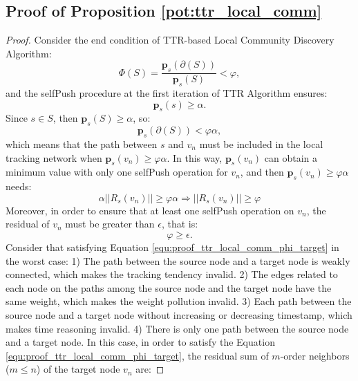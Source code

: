 \subsection{Proof of Proposition \ref{pot:ttr_local_comm}}
\begin{proof}
Consider the end condition of TTR-based Local Community Discovery Algorithm:
\begin{equation}
    \Phi(S)=\frac{\bm{p}_s(\partial(S))}{\bm{p}_s(S)} < \varphi,
\end{equation}
and the selfPush procedure at the first iteration of TTR Algorithm ensures:
\begin{equation}
    \bm{p}_s(s) \geq \alpha.
\end{equation}
Since $s \in S$, then $\bm{p}_s(S) \geq \alpha$, so:
\begin{equation}
    \bm{p}_s(\partial(S))<\varphi \alpha,
\end{equation}
which means that the path between $s$ and $v_n$ must be included in the local tracking network when $\bm{p}_s(v_n) \geq \varphi \alpha$. 
In this way, $\bm{p}_s(v_n)$ can obtain a minimum value with only one selfPush operation for $v_n$, and then $\bm{p}_s(v_n) \geq \varphi \alpha$ needs:
\begin{equation}
    \alpha ||R_s(v_n)|| \geq \varphi \alpha \Rightarrow ||R_s(v_n)|| \geq \varphi
\label{equ:proof_ttr_local_comm_phi_target}
\end{equation}
Moreover, in order to ensure that at least one selfPush operation on $v_n$, the residual of $v_n$ must be greater than $\epsilon$, that is:
\begin{equation}
    \varphi \geq \epsilon.
\end{equation}
Consider that satisfying Equation \ref{equ:proof_ttr_local_comm_phi_target} in the worst case: 
1) The path between the source node and a target node is weakly connected, which makes the tracking tendency invalid.
2) The edges related to each node on the paths among the source node and the target node have the same weight, which makes the weight pollution invalid. 
3) Each path between the source node and a target node without increasing or decreasing timestamp, which makes time reasoning invalid.
4) There is only one path between the source node and a target node.
In this case, in order to satisfy the Equation \ref{equ:proof_ttr_local_comm_phi_target}, the residual sum of $m$-order neighbors ($m \leq n$) of the target node $v_n$ are:

\end{proof}
